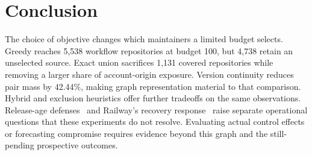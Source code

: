 \section{Conclusion}
The choice of objective changes which maintainers a limited budget selects. Greedy reaches 5,538 workflow repositories at budget 100, but 4,738 retain an unselected source. Exact union sacrifices 1,131 covered repositories while removing a larger share of account-origin exposure. Version continuity reduces pair mass by 42.44\%, making graph representation material to that comparison. Hybrid and exclusion heuristics offer further tradeoffs on the same observations. Release-age defenses~\cite{he2025} and Railway's recovery response~\cite{railwaydisclosure2026} raise separate operational questions that these experiments do not resolve. Evaluating actual control effects or forecasting compromise requires evidence beyond this graph and the still-pending prospective outcomes.
